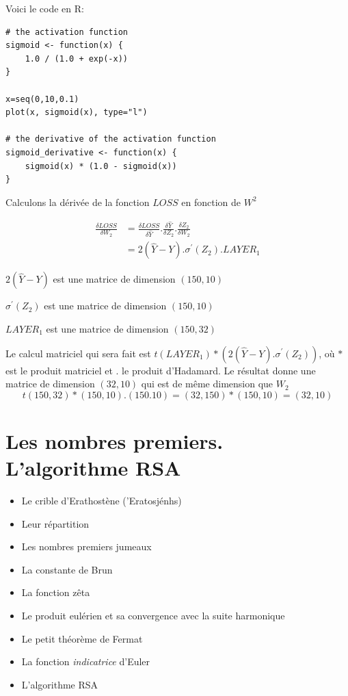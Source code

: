 Voici le code en R:

\begin{Verbatim}
# the activation function
sigmoid <- function(x) {
	1.0 / (1.0 + exp(-x))
}

x=seq(0,10,0.1)
plot(x, sigmoid(x), type="l") 

# the derivative of the activation function
sigmoid_derivative <- function(x) {
	sigmoid(x) * (1.0 - sigmoid(x))
}
\end{Verbatim}


Calculons la dérivée de la fonction $LOSS$ en fonction de $W^2$ 

\begin{align}
\frac{\delta LOSS}{\delta W_2} & =\frac{\delta LOSS}{\delta \hat{Y}} . \frac{\delta \hat{Y}}{\delta Z_2}. \frac{\delta Z_2}{\delta W_2 } \\
 &= 2(\hat{Y}-Y) . \sigma ^\prime (Z_2) . LAYER_1 
\end{align}

$2(\hat{Y}-Y)$ est une matrice de dimension $(150, 10)$

$\sigma ^\prime (Z_2)$ est une matrice de dimension $(150,10)$

$LAYER_1$ est une matrice de dimension $(150,32)$

Le calcul matriciel qui sera fait est $t(LAYER_1)* (2(\hat{Y}-Y) . \sigma ^\prime (Z_2))$, où $*$ est le produit matriciel et $.$ le produit d'Hadamard.
Le résultat donne une matrice de dimension $(32,10)$ qui est de même dimension que $W_2$
$$
t(150,32) * (150,10).(150.10) = (32,150)*(150,10)=(32,10)
$$


\section{Les nombres premiers. L'algorithme RSA}

\begin{itemize}
	\item Le crible d'Erathostène (\textgreek{'Eratosjénhs}) 
	\item Leur répartition
	\item Les nombres premiers jumeaux
	\item La constante de Brun 
	\item La fonction zêta
	\item Le produit eulérien et sa convergence avec la suite harmonique
	\item Le petit théorème de Fermat
	\item La fonction \textit{indicatrice} d'Euler
	\item L'algorithme RSA
\end{itemize}

